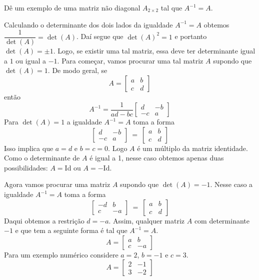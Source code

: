 \begin{problem}
Dê um exemplo de uma matriz não diagonal $A_{2 \times 2}$ tal que $A^{-1} = A$.
\end{problem}
\begin{solution}
Calculando o determinante dos dois lados da igualdade $A^{-1} = A$ obtemos
$\dfrac{1}{\det(A)} = \det(A)$. Daí segue que $\det(A)^2 = 1$ e portanto $\det(A) = \pm 1$. 
Logo, se existir uma tal matriz, essa deve ter determinante igual a $1$ ou igual a $-1$. 
Para começar, vamos procurar uma tal matriz $A$ supondo que $\det(A)=1$.
De modo geral, se
$$A = \left[\begin{array}{rr} a & b \\ c & d \end{array}\right]$$
então
$$A^{-1} = \dfrac{1}{ad-bc} \left[\begin{array}{rr} d & -b \\ -c & a \end{array}\right]$$
Para $\det(A)=1$ a igualdade $A^{-1} = A$ toma a forma
$$\left[\begin{array}{rr} d & -b \\ -c & a \end{array}\right] \ = \
  \left[\begin{array}{rr} a &  b \\  c & d \end{array}\right]$$
Isso implica que $a=d$ e $b=c=0$. Logo $A$ é um múltiplo da matriz identidade. Como o determinante de $A$ é igual a 1, nesse caso obtemos apenas duas possibilidades: $A=$Id ou $A=-$Id.

\medskip
Agora vamos procurar uma matriz $A$ supondo que $\det(A)=-1$.
Nesse caso a igualdade $A^{-1} = A$ toma a forma
$$\left[\begin{array}{rr} -d &  b \\  c & -a \end{array}\right] \ = \
  \left[\begin{array}{rr}  a &  b \\  c &  d \end{array}\right]$$
Daqui obtemos a restrição $d=-a$. Assim, qualquer matriz $A$ com determinante $-1$ e que tem a seguinte forma é tal que $A^{-1} = A$.
$$A = \left[\begin{array}{rr} a & b \\ c & -a \end{array}\right]$$
Para um exemplo numérico considere $a=2$, $b=-1$ e $c=3$.
$$A = \left[\begin{array}{rr} 2 & -1 \\ 3 & -2 \end{array}\right]$$
\end{solution}


